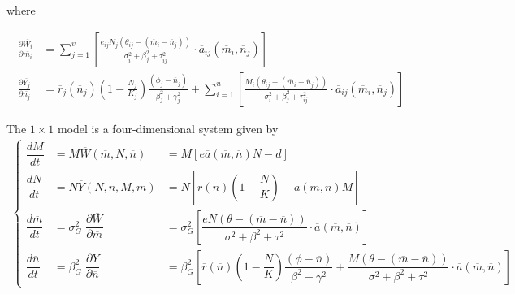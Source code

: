 \documentclass[12pt]{article}
\begin{document}
\noindent where

\begin{align*}
	\frac{\partial \overline{W_i}}{\partial \overline{m_i}} &= \sum_{j=1}^v\left[\frac{e_{ij}N_j(\theta_{ij} - (\overline{m}_i - \overline{n}_j))}{\sigma_i^2 + \beta_j^2 + \tau_{ij}^2} \cdot \overline{a}_{ij}(\overline{m}_i, \overline{n}_j)\right]\\
	\frac{\partial \overline{Y_j}}{\partial \overline{n_j}} &= \overline{r}_j(\overline{n}_j)\left(1 - \frac{N_j}{K_j}\right)\frac{(\phi_j - \overline{n}_j)}{\beta_j^2 + \gamma_j^2} + \sum_{i=1}^u\left[\frac{M_i(\theta_{ij} - (\overline{m}_i - \overline{n}_j))}{\sigma_i^2 + \beta_j^2 + \tau_{ij}^2} \cdot \overline{a}_{ij}(\overline{m}_i, \overline{n}_j)\right]
\end{align*}

\noindent The $1\times1$ model is a four-dimensional system given by
\begin{align*}
	\left\{\begin{array}{lll}
		\dfrac{dM}{dt} &= M \overline{W}(\overline{m}, N, \overline{n}) &= M \left[e\overline{a}(\overline{m}, \overline{n})N - d\right] \\[.5cm]
		\dfrac{dN}{dt} &= N \overline{Y}(N, \overline{n}, M, \overline{m}) &= N \left[\overline{r}(\overline{n}) \left(1 - \dfrac{N}{K} \right) - \overline{a}(\overline{m}, \overline{n}) M\right] \\[.5cm]
		\dfrac{d\overline{m}}{dt} &= \sigma_{G}^2 \; \dfrac{\partial \overline{W}}{\partial \overline{m}} &= \sigma_{G}^2 \left[\dfrac{eN(\theta - (\overline{m} - \overline{n}))}{\sigma^2 + \beta^2 + \tau^2} \cdot \overline{a}(\overline{m}, \overline{n})\right]\\[.5cm]
		\dfrac{d\overline{n}}{dt} &= \beta_{G}^2 \; \dfrac{\partial \overline{Y}}{\partial \overline{n}} &= \beta_{G}^2 \left[\overline{r}(\overline{n})\left(1 - \dfrac{N}{K}\right)\dfrac{(\phi - \overline{n})}{\beta^2 + \gamma^2} + \dfrac{M(\theta - (\overline{m} - \overline{n}))}{\sigma^2 + \beta^2 + \tau^2} \cdot \overline{a}(\overline{m}, \overline{n})\right]
	\end{array}\right.
\end{align*}
\end{document}

